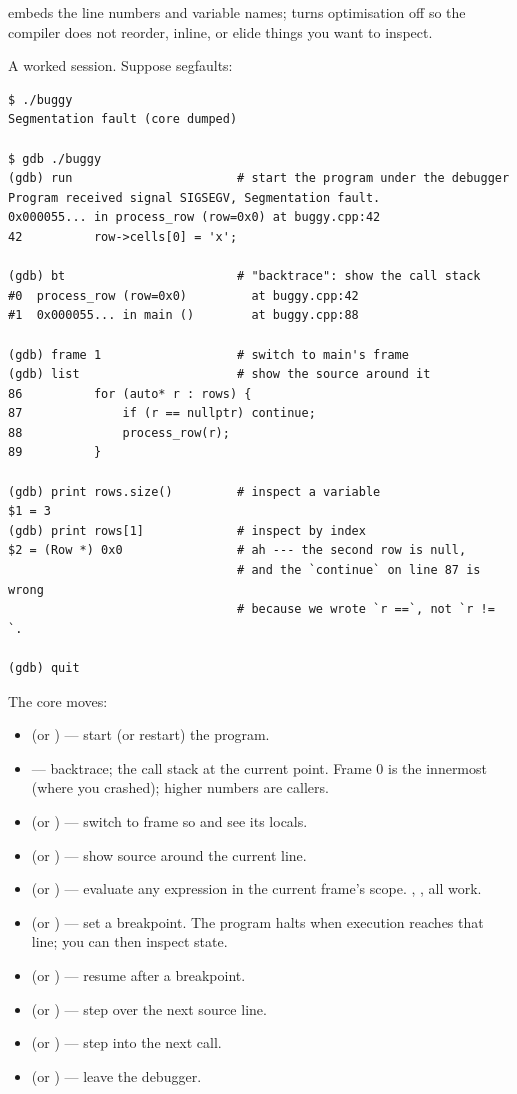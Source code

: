  embeds the line numbers and variable names;
 turns optimisation off so the compiler does not
reorder, inline, or elide things you want to inspect.

A worked session. Suppose  segfaults:

\begin{lstlisting}[style=shell]
$ ./buggy
Segmentation fault (core dumped)

$ gdb ./buggy
(gdb) run                       # start the program under the debugger
Program received signal SIGSEGV, Segmentation fault.
0x000055... in process_row (row=0x0) at buggy.cpp:42
42          row->cells[0] = 'x';

(gdb) bt                        # "backtrace": show the call stack
#0  process_row (row=0x0)         at buggy.cpp:42
#1  0x000055... in main ()        at buggy.cpp:88

(gdb) frame 1                   # switch to main's frame
(gdb) list                      # show the source around it
86          for (auto* r : rows) {
87              if (r == nullptr) continue;
88              process_row(r);
89          }

(gdb) print rows.size()         # inspect a variable
$1 = 3
(gdb) print rows[1]             # inspect by index
$2 = (Row *) 0x0                # ah --- the second row is null,
                                # and the `continue` on line 87 is wrong
                                # because we wrote `r ==`, not `r != `.

(gdb) quit
\end{lstlisting}

The core moves:

\begin{itemize}[leftmargin=*]
  \item {} (or ) --- start (or restart) the program.
  \item {} --- backtrace; the call stack at the current
    point. Frame 0 is the innermost (where you crashed); higher
    numbers are callers.
  \item {} (or ) --- switch to frame
     so  and  see its locals.
  \item {} (or ) --- show source around the
    current line.
  \item {} (or ) --- evaluate any \cpp{}
    expression in the current frame's scope. , ,  all work.
  \item {} (or ) --- set a
    breakpoint. The program halts when execution reaches that
    line; you can then inspect state.
  \item {} (or ) --- resume after a breakpoint.
  \item {} (or ) --- step over the next source line.
  \item {} (or ) --- step into the next call.
  \item {} (or ) --- leave the debugger.
\end{itemize}


